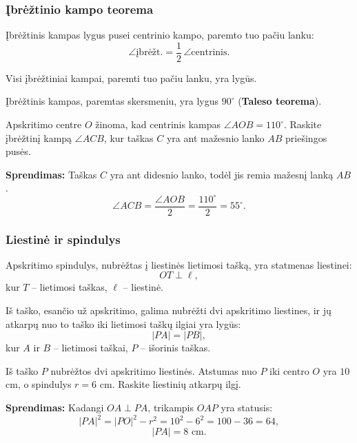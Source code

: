 \subsubsection*{Įbrėžtinio kampo teorema}

\begin{theorem}
Įbrėžtinis kampas lygus pusei centrinio kampo, paremto tuo pačiu lanku:
\[
\angle \text{įbrėžt.} = \frac{1}{2}\,\angle \text{centrinis}.
\]
\end{theorem}

\begin{corollary}
Visi įbrėžtiniai kampai, paremti tuo pačiu lanku, yra lygūs.
\end{corollary}

\begin{corollary}
Įbrėžtinis kampas, paremtas skersmeniu, yra lygus $90^\circ$ (\textbf{Taleso teorema}).
\end{corollary}

\begin{example}
Apskritimo centre $O$ žinoma, kad centrinis kampas $\angle AOB = 110^\circ$. Raskite įbrėžtinį kampą $\angle ACB$, kur taškas $C$ yra ant mažesnio lanko $AB$ priešingos pusės.

\textbf{Sprendimas:} Taškas $C$ yra ant didesnio lanko, todėl jis remia mažesnį lanką $AB$.
\[
\angle ACB = \frac{\angle AOB}{2} = \frac{110^\circ}{2} = 55^\circ.
\]
\end{example}

\subsubsection*{Liestinė ir spindulys}

\begin{theorem}
Apskritimo spindulys, nubrėžtas į liestinės lietimosi tašką, yra statmenas liestinei:
\[
OT \perp \ell,
\]
kur $T$ – lietimosi taškas, $\ell$ – liestinė.
\end{theorem}

\begin{theorem}
Iš taško, esančio už apskritimo, galima nubrėžti dvi apskritimo liestines, ir jų atkarpų nuo to taško iki lietimosi taškų ilgiai yra lygūs:
\[
|PA| = |PB|,
\]
kur $A$ ir $B$ – lietimosi taškai, $P$ – išorinis taškas.
\end{theorem}

\begin{example}
Iš taško $P$ nubrėžtos dvi apskritimo liestinės. Atstumas nuo $P$ iki centro $O$ yra $10$ cm, o spindulys $r = 6$ cm. Raskite liestinių atkarpų ilgį.

\textbf{Sprendimas:} Kadangi $OA \perp PA$, trikampis $OAP$ yra statusis:
\[
|PA|^2 = |PO|^2 - r^2 = 10^2 - 6^2 = 100 - 36 = 64,
\]
\[
|PA| = 8 \text{ cm}.
\]
\end{example}


